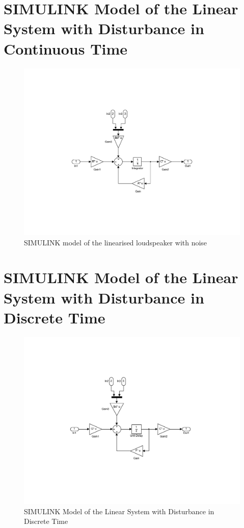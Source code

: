 \documentclass[11pt,a4paper,fleqn, onesside]{report}
\begin{document}
\chapter{SIMULINK Model of the Linear System with Disturbance in Continuous Time}
\label{AppLinearModelNoiseP11}
\begin{figure}[H]
 \centering 
 \includegraphics[trim=5cm 5cm 2cm 5cm, clip=true, totalheight=0.35\textheight, angle=0]{figures/linearModelNoise.pdf}
 \caption{SIMULINK model of the linearised loudspeaker with noise}
\label{fig:linearModelNoise}
\end{figure}

\chapter{SIMULINK Model of the Linear System with Disturbance in Discrete Time}
\label{AppDiscreteTimeP13}
\begin{figure}[H]
 \centering 
 \includegraphics[trim=5cm 5cm 2cm 5cm, clip=true, totalheight=0.35\textheight, angle=0]{figures/modelP13.pdf}
 \caption{SIMULINK Model of the Linear System with Disturbance in Discrete Time}
\label{fig:modelP13}
\end{figure}
\end{document}
